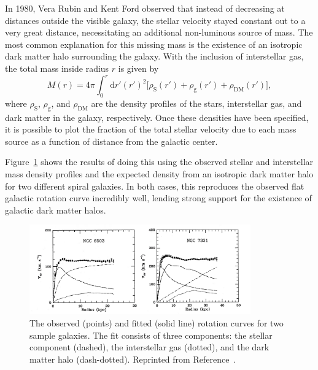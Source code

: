 In 1980, Vera Rubin and Kent Ford observed that instead of decreasing at distances outside the visible galaxy, the stellar velocity stayed constant out to a very great distance, necessitating an additional non-luminous source of mass. %
The most common explanation for this missing mass is the existence of an isotropic dark matter halo surrounding the galaxy.
With the inclusion of interstellar gas, the total mass inside radius $r$ is given by
\begin{equation}
  M(r) = 4 \pi \int_0^r \text{d}r' (r')^2 \Big[\rho_{\text{S}}(r') + \rho_{\text{g}}(r') + \rho_{\text{DM}}(r') \Big],
\end{equation}
where $\rho_{\text{S}}$, $\rho_{\text{g}}$, and $\rho_{\text{DM}}$ are the density profiles of the stars, interstellar gas, and dark matter in the galaxy, respectively.
Once these densities have been specified, it is possible to plot the fraction of the total stellar velocity due to each mass source as a function of distance from the galactic center.

Figure~\ref{fig:rotation_curves} shows the results of doing this using the observed stellar and interstellar mass density profiles and the expected density from an isotropic dark matter halo for two different spiral galaxies.
In both cases, this reproduces the observed flat galactic rotation curve incredibly well, lending strong support for the existence of galactic dark matter halos. 

\begin{figure}[htbp]
  \centering
  \includegraphics[width=0.85\textwidth]{DarkMatter/Figures/rotation_curves.png}
  \caption{
    The observed (points) and fitted (solid line) rotation curves for two sample galaxies.
    The fit consists of three components: the stellar component (dashed), the interstellar gas (dotted), and the dark matter halo (dash-dotted).
    Reprinted from Reference~\cite{}. %
  }
  \label{fig:rotation_curves}
\end{figure}

